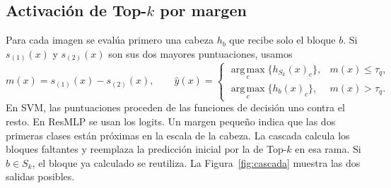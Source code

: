 \documentclass[a4paper,fleqn]{cas-sc}
\begin{document}
\subsection{Activación de Top-$k$ por margen}

Para cada imagen se evalúa primero una cabeza $h_b$ que recibe solo el bloque $b$. Si $s_{(1)}(x)$ y $s_{(2)}(x)$ son sus dos mayores puntuaciones, usamos
\begin{equation}
 m(x)=s_{(1)}(x)-s_{(2)}(x), \qquad
 \hat{y}(x)=
 \begin{cases}
 \operatorname*{arg\,max}_{c}\{h_{S_k}(x)_c\}, & m(x)\leq \tau_q,\\
 \operatorname*{arg\,max}_{c}\{h_b(x)_c\}, & m(x)>\tau_q.
 \end{cases}
 \label{eq:regla}
\end{equation}
En SVM, las puntuaciones proceden de las funciones de decisión uno contra el resto. En ResMLP se usan los logits. Un margen pequeño indica que las dos primeras clases están próximas en la escala de la cabeza. La cascada calcula los bloques faltantes y reemplaza la predicción inicial por la de Top-$k$ en esa rama. Si $b\in S_k$, el bloque ya calculado se reutiliza. La Figura~\ref{fig:cascada} muestra las dos salidas posibles.
\end{document}
